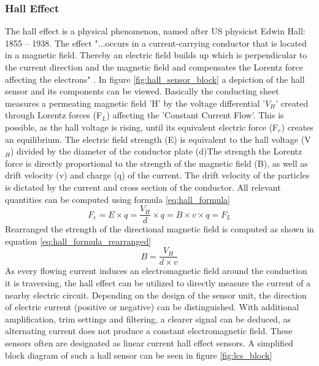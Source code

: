 \subsubsection{Hall Effect}
The hall effect is a physical phenomenon, named after US physicist Edwin Hall: 1855 – 1938. The effect "...occurs in a current-carrying conductor
that is located in a magnetic field. Thereby an electric field builds up which is perpendicular to the current direction and the magnetic field and compensates the Lorentz force affecting the electrons" \cite{Hacker2020_Hall}.
In figure \ref{fig:hall_sensor_block} a depiction of the hall sensor and its components can be viewed. Basically the conducting sheet measures a permeating magnetic field 'H' by the voltage differential '$V_H$' created through Lorentz forces (F$_L$) affecting the 'Constant Current Flow'. This is possible, as the hall voltage is rising, until its equivalent electric force (F$_e$) creates an equilibrium. The electric field strength (E) is equivalent to the hall voltage (V$_H$) divided by the diameter of the conductor plate (d)The strength the Lorentz force is directly proportional to the strength of the magnetic field (B), as well as drift velocity (v) and charge (q) of the current. The drift velocity of the particles is dictated by the current and cross section of the conductor. All relevant quantities can be computed using formula \ref{eq:hall_formula}
\begin{equation}
	F_e = E \times q = \frac{V_H}{d} \times q =  B \times v \times q = F_L
	\label{eq:hall_formula}
\end{equation}
Rearranged the strength of the directional magnetic field is computed as shown in equation \ref{eq:hall_formula_rearranged}
\begin{equation}
	B = \dfrac{V_H}{d \times v}
	\label{eq:hall_formula_rearranged}
\end{equation}
As every flowing current induces an electromagnetic field around the conduction it is traversing, the hall effect can be utilized to directly measure the current of a nearby electric circuit. Depending on the design of the sensor unit, the direction of electric current (positive or negative) can be distinguished. With additional amplification, trim settings and filtering, a clearer signal can be deduced, as alternating current does not produce a constant electromagnetic field. These sensors often are designated as linear current hall effect sensors. A simplified block diagram of such a hall sensor can be seen in figure \ref{fig:lcs_block}
